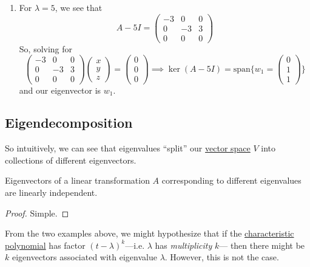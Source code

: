 \begin{example}
\begin{enumerate}
			\item For $\lambda = 5$, we see that 
				\begin{equation}
				  A - 5I = \begin{pmatrix} -3 & 0 & 0 \\ 0 & -3 & 3 \\ 0 & 0 & 0 \end{pmatrix}
				\end{equation}
				So, solving for 
				\begin{equation}
					\begin{pmatrix} -3 & 0 & 0 \\ 0 & -3 & 3 \\ 0 & 0 & 0 \end{pmatrix} \begin{pmatrix} x \\ y \\ z \end{pmatrix} = \begin{pmatrix} 0 \\ 0 \\ 0 \end{pmatrix} \implies \ker(A - 5I) = \mathrm{span} \bigg\{ w_1 = \begin{pmatrix} 0 \\ 1 \\ 1 \end{pmatrix} \bigg\}
				\end{equation} 
				and our eigenvector is $w_1$. 
		\end{enumerate}
	\end{example}

\subsection{Eigendecomposition}

	So intuitively, we can see that eigenvalues ``split'' our \hyperref[def:vector-space]{vector space} $V$ into collections of different eigenvectors. 

	\begin{lemma}
	  \label{thm:eigenvectors-are-linearly-independent}
    Eigenvectors of a linear transformation $A$ corresponding to different eigenvalues are linearly independent. 
  \end{lemma}
  \begin{proof}
		Simple. 
  \end{proof}

	From the two examples above, we might hypothesize that if the \hyperref[def:characteristic-polynomial]{characteristic polynomial} has factor $(t - \lambda)^k$---i.e. $\lambda$ has \textit{multiplicity} $k$--- then there might be $k$ eigenvectors associated with eigenvalue $\lambda$. However, this is not the case. 

